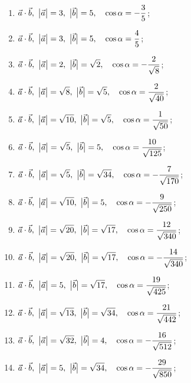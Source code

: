 	\begin{enumerate}
		\setcounter{enumi}{\value{tasks}}
	
			\item \( \displaystyle \vec{a} \cdot \vec{b}, ~ \bigl\vert \vec{a} \bigr\vert = 3, ~ \bigl\vert \vec{b} \bigr\vert = 5, \quad \cos{\alpha} = -\frac{3}{5} \);
			\item \( \displaystyle \vec{a} \cdot \vec{b}, ~ \bigl\vert \vec{a} \bigr\vert = 3, ~ \bigl\vert \vec{b} \bigr\vert = 5, \quad \cos{\alpha} = \frac{4}{5} \);
			\item \( \displaystyle \vec{a} \cdot \vec{b}, ~ \bigl\vert \vec{a} \bigr\vert = 2, ~ \bigl\vert \vec{b} \bigr\vert = \sqrt{2}, \quad \cos{\alpha} = -\frac{2}{ \sqrt{8} } \);
			\item \( \displaystyle \vec{a} \cdot \vec{b}, ~ \bigl\vert \vec{a} \bigr\vert = \sqrt{8}, ~ \bigl\vert \vec{b} \bigr\vert = \sqrt{5}, \quad \cos{\alpha} = \frac{2}{ \sqrt{40} } \);
			\item \( \displaystyle \vec{a} \cdot \vec{b}, ~ \bigl\vert \vec{a} \bigr\vert = \sqrt{10}, ~ \bigl\vert \vec{b} \bigr\vert = \sqrt{5}, \quad \cos{\alpha} = \frac{1}{ \sqrt{50} } \);
			\item \( \displaystyle \vec{a} \cdot \vec{b}, ~ \bigl\vert \vec{a} \bigr\vert = \sqrt{5}, ~ \bigl\vert \vec{b} \bigr\vert = 5, \quad \cos{\alpha} = \frac{10}{ \sqrt{125} } \);
			\item \( \displaystyle \vec{a} \cdot \vec{b}, ~ \bigl\vert \vec{a} \bigr\vert = \sqrt{5}, ~ \bigl\vert \vec{b} \bigr\vert = \sqrt{34}, \quad \cos{\alpha} = -\frac{7}{ \sqrt{170} } \);
			\item \( \displaystyle \vec{a} \cdot \vec{b}, ~ \bigl\vert \vec{a} \bigr\vert = \sqrt{10}, ~ \bigl\vert \vec{b} \bigr\vert = 5, \quad \cos{\alpha} = -\frac{9}{ \sqrt{250} } \);
			\item \( \displaystyle \vec{a} \cdot \vec{b}, ~ \bigl\vert \vec{a} \bigr\vert = \sqrt{20}, ~ \bigl\vert \vec{b} \bigr\vert = \sqrt{17}, \quad \cos{\alpha} = \frac{12}{ \sqrt{340} } \);
			\item \( \displaystyle \vec{a} \cdot \vec{b}, ~ \bigl\vert \vec{a} \bigr\vert = \sqrt{20}, ~ \bigl\vert \vec{b} \bigr\vert = \sqrt{17}, \quad \cos{\alpha} = -\frac{14}{ \sqrt{340} } \);
			\item \( \displaystyle \vec{a} \cdot \vec{b}, ~ \bigl\vert \vec{a} \bigr\vert = 5, ~ \bigl\vert \vec{b} \bigr\vert = \sqrt{17}, \quad \cos{\alpha} = \frac{19}{ \sqrt{425} } \);
			\item \( \displaystyle \vec{a} \cdot \vec{b}, ~ \bigl\vert \vec{a} \bigr\vert = \sqrt{13}, ~ \bigl\vert \vec{b} \bigr\vert = \sqrt{34}, \quad \cos{\alpha} = \frac{21}{ \sqrt{442} } \);
			\item \( \displaystyle \vec{a} \cdot \vec{b}, ~ \bigl\vert \vec{a} \bigr\vert = \sqrt{32}, ~ \bigl\vert \vec{b} \bigr\vert = 4, \quad \cos{\alpha} = -\frac{16}{ \sqrt{512} } \);
			\item \( \displaystyle \vec{a} \cdot \vec{b}, ~ \bigl\vert \vec{a} \bigr\vert = 5, ~ \bigl\vert \vec{b} \bigr\vert = \sqrt{34}, \quad \cos{\alpha} = -\frac{29}{ \sqrt{850} } \);

		\setcounter{tasks}{\value{enumi}}
	\end{enumerate}

